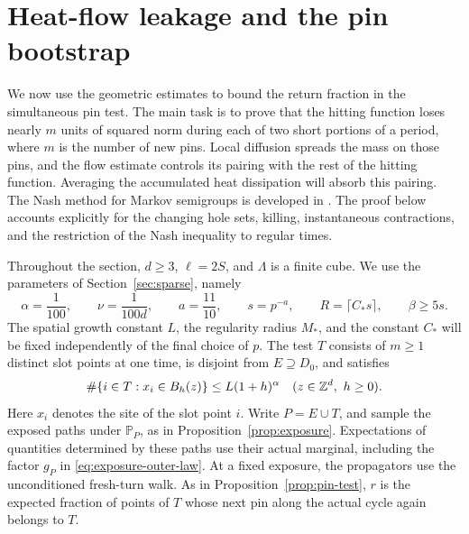 \section{Heat-flow leakage and the pin bootstrap}\label{sec:leakage}

We now use the geometric estimates to bound the return fraction in the
simultaneous pin test.  The main task is to prove that the hitting
function loses nearly $m$ units of squared norm during each of two short
portions of a period, where $m$ is the number of new pins.  Local diffusion
spreads the mass on those pins, and the flow estimate controls its pairing
with the rest of the hitting function.  Averaging the accumulated heat
dissipation will absorb this pairing.
The Nash method for Markov semigroups is developed in
\cite[Section~3]{DiaconisSaloffCoste1996}.  The proof below accounts
explicitly for the changing hole sets, killing, instantaneous
contractions, and the restriction of the Nash inequality to regular
times.

Throughout the section, $d\ge3$, $\ell=2S$, and $\Lambda$ is a finite cube.
We use the parameters of Section~\ref{sec:sparse}, namely
\[
 \alpha=\frac1{100},\qquad \nu=\frac1{100d},\qquad
 a=\frac{11}{10},\qquad s=p^{-a},\qquad R=\lceil C_*s\rceil,
 \qquad \beta\ge5s.
\]
The spatial growth constant $L$, the regularity radius $M_*$, and the
constant $C_*$ will be fixed independently of the final choice of $p$.
The test $T$ consists of $m\ge1$ distinct slot points at one time, is
disjoint from $E\supseteq D_0$, and satisfies
\begin{equation}\label{eq:leakage-growth}
 \#\{i\in T:x_i\in B_h(z)\}\le L(1+h)^\alpha
 \quad(z\in\mathbb Z^d,\ h\ge0).
\end{equation}
Here $x_i$ denotes the site of the slot point $i$.
Write $P=E\cup T$, and sample the exposed paths under $\mathbb P_P$,
as in Proposition~\ref{prop:exposure}.  Expectations of quantities
determined by these paths use their actual marginal, including the factor $g_P$ in
\eqref{eq:exposure-outer-law}.  At a fixed exposure, the propagators use
the unconditioned fresh-turn walk.  As in
Proposition~\ref{prop:pin-test}, $r$ is the
expected fraction of points of $T$ whose next pin along the actual
cycle again belongs to $T$.

